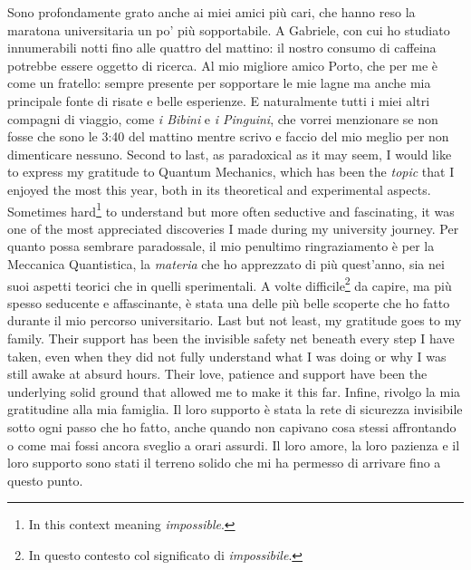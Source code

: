 \begin{paracol}{2}
    \switchcolumn
    Sono profondamente grato anche ai miei amici più cari, che hanno reso la maratona universitaria un po' più sopportabile. A Gabriele, con cui ho studiato innumerabili notti fino alle quattro del mattino: il nostro consumo di caffeina potrebbe essere oggetto di ricerca. Al mio migliore amico Porto, che per me è come un fratello: sempre presente per sopportare le mie lagne ma anche mia principale fonte di risate e belle esperienze. E naturalmente tutti i miei altri compagni di viaggio, come \emph{i Bibini} e \emph{i Pinguini}, che vorrei menzionare se non fosse che sono le 3:40 del mattino mentre scrivo e faccio del mio meglio per non dimenticare nessuno.
    \switchcolumn*
    Second to last, as paradoxical as it may seem, I would like to express my gratitude to Quantum Mechanics, which has been the \emph{topic} that I enjoyed the most this year, both in its theoretical and experimental aspects. Sometimes hard\footnote{In this context meaning \emph{impossible}.} to understand but more often seductive and fascinating, it was one of the most appreciated discoveries I made during my university journey.
    \switchcolumn
    Per quanto possa sembrare paradossale, il mio penultimo ringraziamento è per la Meccanica Quantistica, la \emph{materia} che ho apprezzato di più quest'anno, sia nei suoi aspetti teorici che in quelli sperimentali. A volte difficile\footnote{In questo contesto col significato di \emph{impossibile}.} da capire, ma più spesso seducente e affascinante, è stata una delle più belle scoperte che ho fatto durante il mio percorso universitario.
    \switchcolumn*
    Last but not least, my gratitude goes to my family. Their support has been the invisible safety net beneath every step I have taken, even when they did not fully understand what I was doing or why I was still awake at absurd hours. Their love, patience and support have been the underlying solid ground that allowed me to make it this far.
    \switchcolumn
    Infine, rivolgo la mia gratitudine alla mia famiglia. Il loro supporto è stata la rete di sicurezza invisibile sotto ogni passo che ho fatto, anche quando non capivano cosa stessi affrontando o come mai fossi ancora sveglio a orari assurdi. Il loro amore, la loro pazienza e il loro supporto sono stati il terreno solido che mi ha permesso di arrivare fino a questo punto.





\end{paracol}


